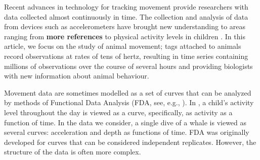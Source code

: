 



Recent advances in technology for tracking movement provide researchers with data collected almost continuously in time.
The collection and analysis of data from devices such as accelerometers have brought new understanding to areas ranging from  {\bf{more references}}  to physical activity levels in children \citep{Morris:2007}.
In this article, we focus on the study of animal movement;  tags attached to animals record observations at rates of tens of hertz, resulting in time series containing millions of observations over the course of several hours and providing biologists with new information about  animal behaviour.


Movement data are sometimes modelled as a set of curves that can  be analyzed by methods of Functional Data Analysis (FDA, see, e.g., \citealt{Ramsay:2005}).  In \cite{Morris:2007}, a child's activity level throughout the day is viewed as a curve, specifically, as activity as a function of time.   
In the data  we consider, a single dive of a whale is viewed as several curves:  acceleration and depth as  functions of time.
FDA was originally developed for curves that can be considered independent replicates.
However, the structure of the data is often more complex.


